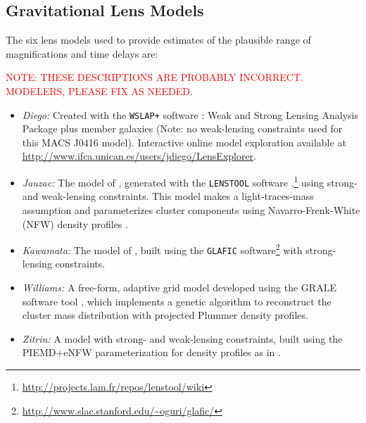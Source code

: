 \subsection{Gravitational Lens Models}\label{sec:LensingModels}



The six lens models used to provide estimates of the plausible range
of magnifications and time delays are:

 \textcolor{red}{NOTE: THESE
  DESCRIPTIONS ARE PROBABLY INCORRECT.  MODELERS, PLEASE FIX AS
  NEEDED.}


\bigskip
\begin{itemize}
\item{\it Diego:} Created with the {\tt WSLAP+} software
  \citep{Sendra:2014}: Weak and Strong Lensing Analysis Package plus
  member galaxies (Note: no weak-lensing constraints used for this
  MACS J0416 model). Interactive online model exploration available at
  \url{http://www.ifca.unican.es/users/jdiego/LensExplorer}.
\item{{\it Jauzac:} The model of \citet{Jauzac:2014}, generated with
  the {\tt LENSTOOL} software
  \citep{Jullo:2007},\footnote{\url{http://projects.lam.fr/repos/lenstool/wiki}}}
  using strong- and weak-lensing constraints.  This model makes a
  light-traces-mass assumption and parameterizes cluster components
  using Navarro-Frenk-White (NFW) density profiles
  \citep{Navarro:1997}.
\item{\it Kawamata:} The model of \citet{Kawamata:2015}, built using the
  {\tt GLAFIC}
  software\footnote{\url{http://www.slac.stanford.edu/~oguri/glafic/}}
  with strong-lensing constraints.
\item{{\it Williams:} A free-form, adaptive grid model developed using
  the GRALE software tool \citep{Liesenborgs:2006, Liesenborgs:2007,
    Mohammed:2014, Sebesta:2016}, which implements a genetic algorithm
  to reconstruct the cluster mass distribution with projected Plummer
  \citeyear{Plummer:1911} density profiles.}
\item{{\it Zitrin:} A model with strong- and weak-lensing constraints,
  built using the PIEMD+eNFW parameterization for density profiles as
  in \citet{Zitrin:2009a}.}
\end{itemize}
\bigskip    

